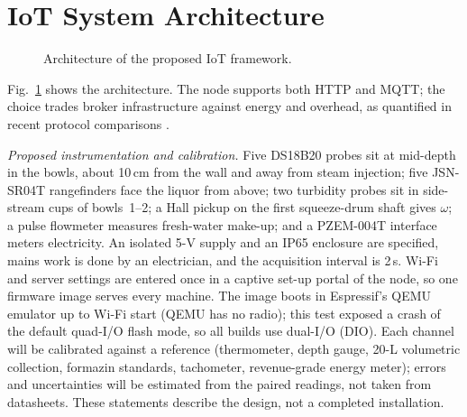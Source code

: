\documentclass[journal]{IEEEtran}
\begin{document}
\section{IoT System Architecture}
\begin{figure}[t]
\centering
{}
\caption{Architecture of the proposed IoT framework.}
\label{fig:arch}
\end{figure}
Fig.~\ref{fig:arch} shows the architecture. The node supports both HTTP and MQTT; the choice trades
broker infrastructure against energy and overhead, as quantified in recent protocol comparisons
\cite{seoane2021performance,dalmas2026comparative}.

\emph{Proposed instrumentation and calibration.} Five DS18B20 probes sit at mid-depth in the bowls, about 10\,cm
from the wall and away from steam injection; five JSN-SR04T rangefinders face the liquor from above; two turbidity
probes sit in side-stream cups of bowls~1--2; a Hall pickup on the first squeeze-drum shaft gives $\omega$; a pulse
flowmeter measures fresh-water make-up; and a PZEM-004T interface meters electricity. An isolated 5-V supply and an
IP65 enclosure are specified, mains work is done by an electrician, and the acquisition interval is 2\,s. Wi-Fi and
server settings are entered once in a captive set-up portal of the node, so one firmware image serves every machine.
The image boots in Espressif's QEMU emulator up to Wi-Fi start (QEMU has no radio); this test exposed a crash of the
default quad-I/O flash mode, so all builds use dual-I/O (DIO).
Each channel will be calibrated against a reference (thermometer, depth gauge, 20-L volumetric collection, formazin
standards, tachometer, revenue-grade energy meter); errors and uncertainties will be estimated from the paired
readings, not taken from datasheets. These statements describe the design, not a completed installation.
\end{document}
